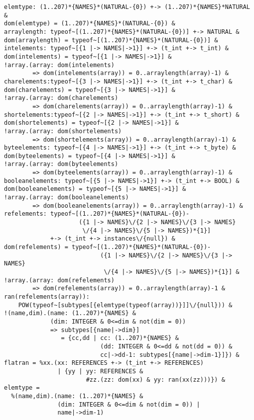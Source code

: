 \begin{verbatim}
elemtype: (1..207)*{NAMES}*(NATURAL-{0}) +-> (1..207)*{NAMES}*NATURAL & 
dom(elemtype) = (1..207)*{NAMES}*(NATURAL-{0}) & 
arraylength: typeof~[(1..207)*{NAMES}*(NATURAL-{0})] +-> NATURAL & 
dom(arraylength) = typeof~[(1..207)*{NAMES}*(NATURAL-{0})] & 
intelements: typeof~[{1 |-> NAMES|->1}] +-> (t_int +-> t_int) &
dom(intelements) = typeof~[{1 |-> NAMES|->1}] & 
!array.(array: dom(intelements) 
        => dom(intelements(array)) = 0..arraylength(array)-1) & 
charelements:typeof~[{3 |-> NAMES|->1}] +-> (t_int +-> t_char) &
dom(charelements) = typeof~[{3 |-> NAMES|->1}] & 
!array.(array: dom(charelements) 
        => dom(charelements(array)) = 0..arraylength(array)-1) & 
shortelements:typeof~[{2 |-> NAMES|->1}] +-> (t_int +-> t_short) &
dom(shortelements) = typeof~[{2 |-> NAMES|->1}] & 
!array.(array: dom(shortelements) 
        => dom(shortelements(array)) = 0..arraylength(array)-1) & 
byteelements: typeof~[{4 |-> NAMES|->1}] +-> (t_int +-> t_byte) &
dom(byteelements) = typeof~[{4 |-> NAMES|->1}] & 
!array.(array: dom(byteelements) 
        => dom(byteelements(array)) = 0..arraylength(array)-1) & 
booleanelements: typeof~[{5 |-> NAMES|->1}] +-> (t_int +-> BOOL) &
dom(booleanelements) = typeof~[{5 |-> NAMES|->1}] & 
!array.(array: dom(booleanelements) 
        => dom(booleanelements(array)) = 0..arraylength(array)-1) & 
refelements: typeof~[(1..207)*{NAMES}*(NATURAL-{0})-
                     ({1 |-> NAMES}\/{2 |-> NAMES}\/{3 |-> NAMES}
                      \/{4 |-> NAMES}\/{5 |-> NAMES})*{1}] 
             +-> (t_int +-> instances\/{null}) &
dom(refelements) = typeof~[(1..207)*{NAMES}*(NATURAL-{0})-
                           ({1 |-> NAMES}\/{2 |-> NAMES}\/{3 |-> NAMES}
                            \/{4 |-> NAMES}\/{5 |-> NAMES})*{1}] & 
!array.(array: dom(refelements) 
        => dom(refelements(array)) = 0..arraylength(array)-1 & 
ran(refelements(array)): 
    POW(typeof~[subtypes[{elemtype(typeof(array))}]]\/{null})) & 
!(name,dim).(name: (1..207)*{NAMES} & 
             (dim: INTEGER & 0<=dim & not(dim = 0)) 
             => subtypes[{name|->dim}] 
                = {cc,dd | cc: (1..207)*{NAMES} & 
                           (dd: INTEGER & 0<=dd & not(dd = 0)) & 
                           cc|->dd-1: subtypes[{name|->dim-1}]}) & 
flatran = %xx.(xx: REFERENCES +-> (t_int +-> REFERENCES) 
               | {yy | yy: REFERENCES & 
                       #zz.(zz: dom(xx) & yy: ran(xx(zz)))}) & 
elemtype = 
  %(name,dim).(name: (1..207)*{NAMES} & 
               (dim: INTEGER & 0<=dim & not(dim = 0)) | 
               name|->dim-1)
\end{verbatim}

